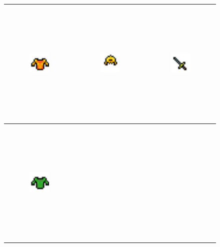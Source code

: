 \begin{figure}[h!]
    \begin{center}
        \begin{tabular}{ | c | c | c | }
            \hline
            \includegraphics[width=0.3\textwidth, height=60mm]{images/Entity_Armor_01.png}
            & 
            \includegraphics[width=0.3\textwidth, height=60mm]{images/Entity_Helmet_01.png}    
            & 
            \includegraphics[width=0.3\textwidth, height=60mm]{images/Entity_Weapon_01.png}
            \\
            \hline
            \includegraphics[width=0.3\textwidth, height=60mm]{images/Entity_Armor_02.png}

\end{tabular}
\end{center}
\end{figure}
